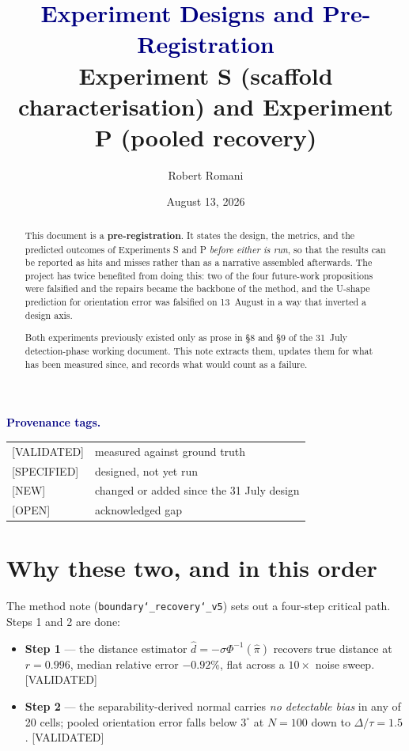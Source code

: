 \documentclass[11pt]{article}
\title{\textcolor{navy}{\sffamily Experiment Designs and Pre-Registration}\\[6pt]
\large\normalfont Experiment S (scaffold characterisation) and Experiment P (pooled recovery)}
\author{Robert Romani}
\date{August 13, 2026}
\newcommand{\dhat}{\hat{d}}
\newcommand{\pihat}{\hat{\pi}}
\newcommand{\provtag}[2]{{\footnotesize\sffamily\textcolor{#1}{[#2]}}}
\newcommand{\VALID}{\provtag{okgreen}{VALIDATED}}
\newcommand{\SPEC}{\provtag{specblue}{SPECIFIED}}
\newcommand{\NEWT}{\provtag{newmag}{NEW}}
\newcommand{\OPENT}{\provtag{openamber}{OPEN}}
\begin{document}
\maketitle

\begin{abstract}
\noindent This document is a \textbf{pre-registration}. It states the design, the metrics, and
the predicted outcomes of Experiments S and P \emph{before either is run}, so that the results
can be reported as hits and misses rather than as a narrative assembled afterwards. The project
has twice benefited from doing this: two of the four future-work propositions were falsified and
the repairs became the backbone of the method, and the U-shape prediction for orientation error
was falsified on 13~August in a way that inverted a design axis.

\medskip
\noindent Both experiments previously existed only as prose in \S8 and \S9 of
the 31~July
detection-phase working document. This note extracts them, updates them
for what has been measured since, and records what would count as a failure.
\end{abstract}

\noindent\textbf{\sffamily\small\textcolor{navy}{Provenance tags.}}
\smallskip

{\small
\begin{tabular}{@{}ll@{}}
\VALID & measured against ground truth\\
\SPEC & designed, not yet run\\
\NEWT & changed or added since the 31 July design\\
\OPENT & acknowledged gap\\
\end{tabular}}

\vspace{0.4em}

\section{Why these two, and in this order}

The method note (\texttt{boundary\char`_recovery\char`_v5}) sets out a four-step critical path. Steps 1
and 2 are done:

\begin{itemize}
\item \textbf{Step 1} --- the distance estimator $\dhat = -\sigma\Phi^{-1}(\pihat)$ recovers true
distance at $r = 0.996$, median relative error $-0.92\%$, flat across a $10\times$ noise sweep.
\VALID
\item \textbf{Step 2} --- the separability-derived normal carries \emph{no detectable bias} in
any of 20 cells; pooled orientation error falls below $3^\circ$ at $N = 100$ down to
$\Delta/\tau = 1.5$. \VALID
\end{itemize}
\end{document}
